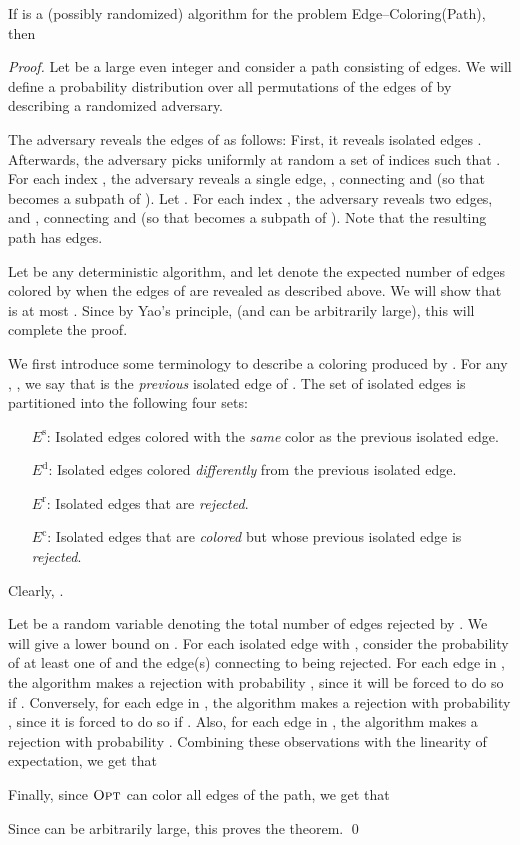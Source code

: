 \documentclass[smallextended]{svjour3}
\def\mcpath{{\sc Edge--Coloring(Path)}\xspace}
\newcommand{\OPT}{\ensuremath{\operatorname{\textsc{Opt}}}\xspace}
\newcommand{\eis}{\ensuremath{E^{\text{s}}}\xspace}
\newcommand{\eid}{\ensuremath{E^{\text{d}}}\xspace}
\newcommand{\eir}{\ensuremath{E^{\text{r}}}\xspace}
\newcommand{\eic}{\ensuremath{E^{\text{c}}}\xspace}
\begin{document}
\begin{theorem}
\label{yao}
If  is a (possibly randomized) algorithm for the problem \mcpath, then
 
\end{theorem}
\begin{proof}
 Let  be a large even integer and consider a path  consisting of  edges. We will define a probability distribution over all permutations of the edges of  by describing a randomized adversary.
 
The adversary reveals the edges of  as follows: First, it reveals  isolated edges  . Afterwards, the adversary picks uniformly at random a set of indices  such that . For each index , the adversary reveals a single edge, , connecting  and  (so that  becomes a subpath of ). 
Let .
For each index , the adversary reveals two edges,  and , connecting  and  (so that  becomes a subpath of ). Note that the resulting path  has  edges.

Let  be any deterministic algorithm, and let  denote the expected number of edges colored by  when the edges of  are revealed as described above. We will show that
  is at most \mbox{}. 
Since by Yao's principle,  (and  can be arbitrarily large), this will complete the proof. 

We first introduce some terminology to describe a coloring produced by .
For any , , we say that  is the \emph{previous} isolated edge of . 
The set of isolated edges is partitioned into the following four sets:
\begin{enumerate}[\eis:]
\item[\eis:] Isolated edges colored with the {\em same} color as the previous isolated edge. 
\item[\eid:] Isolated edges colored {\em differently} from the previous isolated edge. 
\item[\eir:] Isolated edges that are {\em rejected}.
\item[\eic:] Isolated edges that are {\em colored} but whose previous isolated edge is {\em rejected}. 
\end{enumerate}
Clearly, . 

Let  be a random variable denoting the total number of edges rejected by . We will give a lower bound on .
For each isolated edge  with , consider the probability of at least one of  and the edge(s)
connecting  to  being rejected. For each edge in
, the algorithm  makes a rejection with probability
, since it will be forced to do so if
. Conversely, for each edge in , the algorithm 
makes a rejection with probability , since it is forced to
do so if . Also, for each edge in , the algorithm
 makes a rejection with probability . Combining these observations with the linearity of expectation, we get that

Finally, since \OPT can color all  edges of the path, we get that 
 
Since  can be arbitrarily large, this proves the theorem.
\qed\end{proof}
\end{document}
